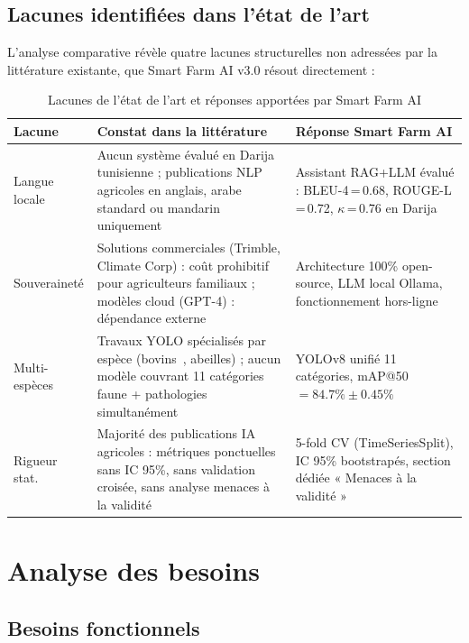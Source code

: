 \subsection{Lacunes identifiées dans l'état de l'art}

L'analyse comparative révèle quatre lacunes structurelles non adressées par
la littérature existante, que Smart Farm AI v3.0 résout directement :

\begin{table}[H]
\centering
\caption{Lacunes de l'état de l'art et réponses apportées par Smart Farm AI}
\label{tab:lacunes_etat_art}
\begin{tabularx}{\linewidth}{lXX}
\toprule
\textbf{Lacune} & \textbf{Constat dans la littérature} & \textbf{Réponse Smart Farm AI} \\
\midrule
Langue locale &
  Aucun système évalué en Darija tunisienne ; publications NLP agricoles
  en anglais, arabe standard ou mandarin uniquement~\cite{abbou2024arabic} &
  Assistant RAG+LLM évalué : BLEU-4\,=\,0.68, ROUGE-L\,=\,0.72,
  $\kappa$\,=\,0.76 en Darija \\
\addlinespace
Souveraineté &
  Solutions commerciales (Trimble, Climate Corp) : coût prohibitif pour
  agriculteurs familiaux ; modèles cloud (GPT-4) : dépendance externe &
  Architecture 100\% open-source, LLM local Ollama, fonctionnement
  hors-ligne \\
\addlinespace
Multi-espèces &
  Travaux YOLO spécialisés par espèce (bovins~\cite{chen2023yolo_livestock},
  abeilles) ; aucun modèle couvrant 11 catégories faune + pathologies
  simultanément &
  YOLOv8 unifié 11 catégories, mAP@50\,$= 84.7\% \pm 0.45\%$ \\
\addlinespace
Rigueur stat. &
  Majorité des publications IA agricoles : métriques ponctuelles sans
  IC 95\%, sans validation croisée, sans analyse menaces à la
  validité~\cite{liakos2018} &
  5-fold CV (TimeSeriesSplit), IC 95\% bootstrapés, section dédiée
  « Menaces à la validité » \\
\bottomrule
\end{tabularx}
\end{table}

\section{Analyse des besoins}

\subsection{Besoins fonctionnels}


